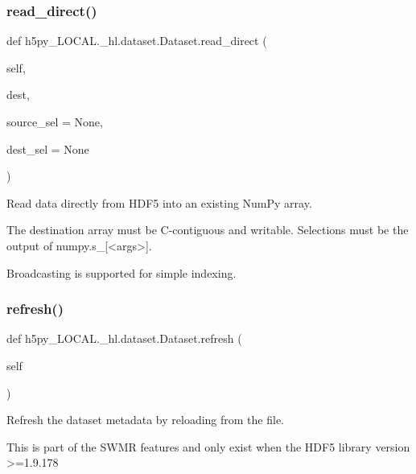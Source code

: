 \subsubsection{\texorpdfstring{read\+\_\+direct()}{read\_direct()}}
{\footnotesize\ttfamily def h5py\+\_\+\+L\+O\+C\+A\+L.\+\_\+hl.\+dataset.\+Dataset.\+read\+\_\+direct (\begin{DoxyParamCaption}\item[{}]{self,  }\item[{}]{dest,  }\item[{}]{source\+\_\+sel = {\ttfamily None},  }\item[{}]{dest\+\_\+sel = {\ttfamily None} }\end{DoxyParamCaption})}

\begin{DoxyVerb}Read data directly from HDF5 into an existing NumPy array.

The destination array must be C-contiguous and writable.
Selections must be the output of numpy.s_[<args>].

Broadcasting is supported for simple indexing.
\end{DoxyVerb}
 \mbox{\label{classh5py__LOCAL_1_1__hl_1_1dataset_1_1Dataset_a96cf84977c113470bbe4afe95cbf9053}} 
\subsubsection{\texorpdfstring{refresh()}{refresh()}}
{\footnotesize\ttfamily def h5py\+\_\+\+L\+O\+C\+A\+L.\+\_\+hl.\+dataset.\+Dataset.\+refresh (\begin{DoxyParamCaption}\item[{}]{self }\end{DoxyParamCaption})}

\begin{DoxyVerb}Refresh the dataset metadata by reloading from the file.

This is part of the SWMR features and only exist when the HDF5
library version >=1.9.178
\end{DoxyVerb}
 \mbox{\label{classh5py__LOCAL_1_1__hl_1_1dataset_1_1Dataset_af5c662f8e5c654847e40e526c8566944}} 

